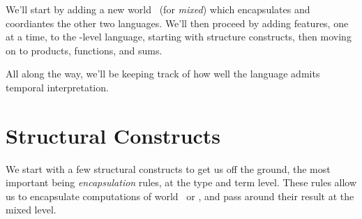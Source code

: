 \documentclass[]{article}
\begin{document}
We'll start by adding a new world \bbem\ (for {\em mixed}) which encapsulates and coordiantes the other two languages.
We'll then proceed by adding features, one at a time, to the \bbem-level language,
starting with structure constructs, then moving on to products, functions, and sums.

All along the way, we'll be keeping track of how well the language admits temporal interpretation.

\section{Structural Constructs}

We start with a few structural constructs to get us off the ground,
the most important being {\em encapsulation} rules, at the type and term level.
These rules allow us to encapsulate computations of world \bbone\ or \bbtwo,
and pass around their result at the mixed level.

\end{document}
